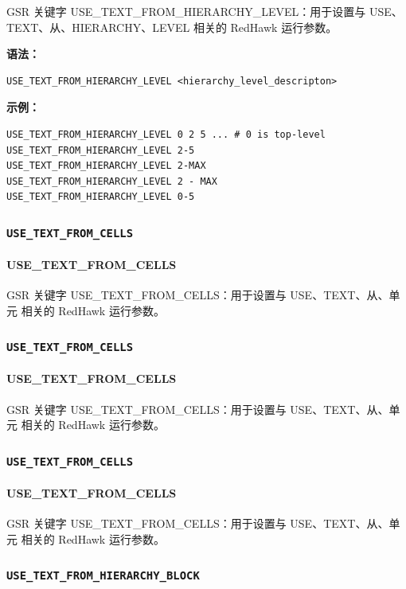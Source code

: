 GSR 关键字 USE_TEXT_FROM_HIERARCHY_LEVEL：用于设置与 USE、TEXT、从、HIERARCHY、LEVEL 相关的 RedHawk 运行参数。

\textbf{语法：}
\begin{lstlisting}
USE_TEXT_FROM_HIERARCHY_LEVEL <hierarchy_level_descripton>
\end{lstlisting}

\textbf{示例：}
\begin{lstlisting}
USE_TEXT_FROM_HIERARCHY_LEVEL 0 2 5 ... # 0 is top-level
USE_TEXT_FROM_HIERARCHY_LEVEL 2-5
USE_TEXT_FROM_HIERARCHY_LEVEL 2-MAX
USE_TEXT_FROM_HIERARCHY_LEVEL 2 - MAX
USE_TEXT_FROM_HIERARCHY_LEVEL 0-5
\end{lstlisting}

\subsubsection{\texttt{USE_TEXT_FROM_CELLS}}
\paragraph*{USE_TEXT_FROM_CELLS}

GSR 关键字 USE_TEXT_FROM_CELLS：用于设置与 USE、TEXT、从、单元 相关的 RedHawk 运行参数。

\subsubsection{\texttt{USE_TEXT_FROM_CELLS}}
\paragraph*{USE_TEXT_FROM_CELLS}

GSR 关键字 USE_TEXT_FROM_CELLS：用于设置与 USE、TEXT、从、单元 相关的 RedHawk 运行参数。

\subsubsection{\texttt{USE_TEXT_FROM_CELLS}}
\paragraph*{USE_TEXT_FROM_CELLS}

GSR 关键字 USE_TEXT_FROM_CELLS：用于设置与 USE、TEXT、从、单元 相关的 RedHawk 运行参数。

\subsubsection{\texttt{USE_TEXT_FROM_HIERARCHY_BLOCK}}
